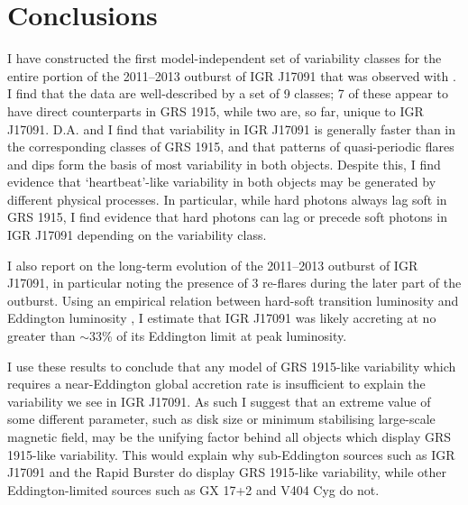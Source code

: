 \section{Conclusions}

\par I have constructed the first model-independent set of variability classes for the entire portion of the 2011--2013 outburst of IGR J17091 that was observed with \indexrxte\rxte .  I find that the data are well-described by a set of 9 classes;  7 of these appear to have direct counterparts in GRS 1915, while two are, so far, unique to IGR J17091.  \textsf{D.A.} and I find that variability in IGR J17091 is generally faster than in the corresponding classes of GRS 1915, and that patterns of quasi-periodic flares and dips form the basis of most variability in both objects.  Despite this, I find evidence that `heartbeat'\indexrho-like variability in both objects may be generated by different physical processes.  In particular, while hard photons always lag soft in GRS 1915, I find evidence that hard photons can lag or precede soft photons in IGR J17091 depending on the variability class.
\par I also report on the long-term evolution of the 2011--2013 outburst of IGR J17091, in particular noting the presence of 3 re-flares during the later part of the outburst.  Using an empirical relation between hard-soft transition luminosity and Eddington luminosity \citep{Maccarone_2pct}, I estimate that IGR J17091 was likely accreting at no greater than $\sim33$\% of its Eddington limit at peak luminosity.
\par I use these results to conclude that any model of GRS 1915-like variability which requires a near-Eddington global accretion rate is insufficient to explain the variability we see in IGR J17091.  As such I suggest that an extreme value of some different parameter, such as disk size or minimum stabilising large-scale magnetic field, may be the unifying factor behind all objects which display GRS 1915-like variability.  This would explain why sub-Eddington sources such as IGR J17091 and the Rapid Burster do display GRS 1915-like variability, while other Eddington-limited sources such as GX 17+2 and V404 Cyg do not.